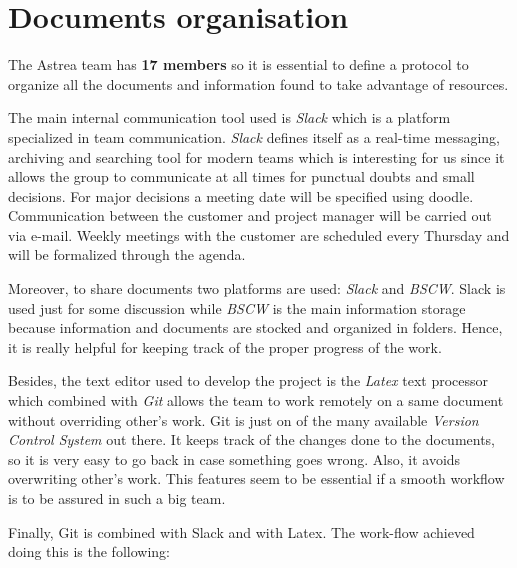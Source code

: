 \section{Documents organisation}
The Astrea team has \textbf{17 members} so it is essential to define a protocol to organize all the documents and information found to take advantage of resources. 

The main internal communication tool used is \textit{Slack} which is a platform specialized in team communication. \textit{Slack} defines itself as a real-time messaging, archiving and searching tool for modern teams which is interesting for us since it allows the group to communicate at all times for punctual doubts and small decisions. For major decisions a meeting date will be specified using doodle. Communication between the customer and project manager will be carried out via e-mail. Weekly meetings with the customer are scheduled every Thursday and will be formalized through the agenda.

Moreover, to share documents two platforms are used: \textit{Slack} and \textit{BSCW}. Slack is used just for some discussion while \textit{BSCW} is the main information storage because information and documents are stocked and organized in folders. Hence, it is really helpful for keeping track of the proper progress of the work.

Besides, the text editor used to develop the project is the \textit{Latex} text processor which combined with \textit{Git} allows the team to work remotely on a same document without overriding other's work.  Git is just on of the many available \textit{Version Control System} out there. It keeps track of the changes done to the documents, so it is very easy to go back in case something goes wrong. Also, it avoids overwriting other's work. This features seem to be essential if a smooth workflow is to be assured in such a big team.

Finally, Git is combined with Slack and with Latex. The work-flow achieved doing this is the following:

